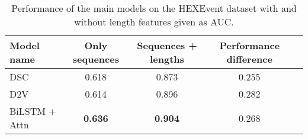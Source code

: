 \begin{table}[h!]
	\centering
	\begin{tabular}{| l | c | c | c| c} 
		\hline
		Model name & Only sequences & Sequences + lengths & Performance difference\\
		\hline
		DSC & 0.618 & 0.873 & 0.255\\
		D2V & 0.614 & 0.896 & 0.282\\
		BiLSTM + Attn & \textbf{0.636} & \textbf{0.904} & 0.268\\
		\hline
	\end{tabular}
	\caption{Performance of the main models on the HEXEvent dataset with and without length features given as AUC.  
	}
	\label{table:results_hexevent}
\end{table}
